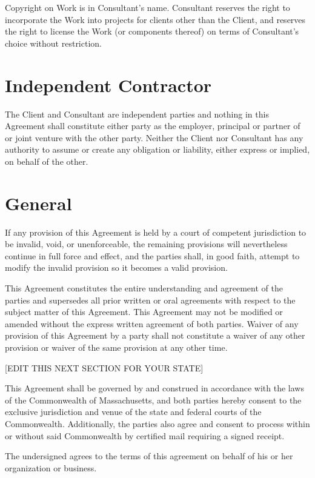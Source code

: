 \documentclass[10pt]{article}
\begin{document}
Copyright on Work is in Consultant's name.  Consultant reserves the right to incorporate the Work into projects for clients other than the Client, and reserves the right to license the Work (or components thereof) on terms of Consultant's choice without restriction.


\section{Independent Contractor}

The Client and Consultant are independent parties and nothing in this
Agreement shall constitute either party as the employer, principal or
partner of or joint venture with the other party.  Neither the Client nor
Consultant has any authority to assume or create any obligation or
liability, either express or implied, on behalf of the other.

\section{General}

If any provision of this Agreement is held by a court of competent
jurisdiction to be invalid, void, or unenforceable, the remaining provisions
will nevertheless continue in full force and effect, and the parties shall,
in good faith, attempt to modify the invalid provision so it becomes a valid
provision.

This Agreement constitutes the entire understanding and agreement of the
parties and supersedes all prior written or oral agreements with respect to
the subject matter of this Agreement. This Agreement may not be modified or
amended without the express written agreement of both parties. Waiver of any
provision of this Agreement by a party shall not constitute a waiver of any
other provision or waiver of the same provision at any other time.

[EDIT THIS NEXT SECTION FOR YOUR STATE]

This Agreement shall be governed by and construed in accordance with the
laws of the Commonwealth of Massachusetts, and both parties hereby consent
to the exclusive jurisdiction and venue of the state and federal courts of
the Commonwealth. Additionally, the parties also agree and consent to
process within or without said Commonwealth by certified mail requiring a
signed receipt.

\vspace{1cm} 

\noindent The undersigned agrees to the terms of this agreement on behalf of his or
her organization or business.\\\\
\end{document}
